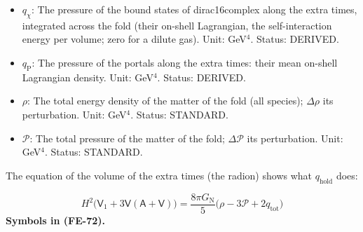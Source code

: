 \documentclass[
  10pt,
]{article}
\begin{document}
\begin{itemize}
\item
  \(q_\chi\): The pressure of the bound states of dirac16complex along
  the extra times, integrated across the fold (their on-shell
  Lagrangian, the self-interaction energy per volume; zero for a dilute
  gas). Unit: GeV\(^4\). Status: DERIVED.
\item
  \(q_{\mathrm{P}}\): The pressure of the portals along the extra times:
  their mean on-shell Lagrangian density. Unit: GeV\(^4\). Status:
  DERIVED.
\item
  \(\rho\): The total energy density of the matter of the fold (all
  species); \(\Delta\rho\) its perturbation. Unit: GeV\(^4\). Status:
  STANDARD.
\item
  \(\mathcal{P}\): The total pressure of the matter of the fold;
  \(\Delta\mathcal{P}\) its perturbation. Unit: GeV\(^4\). Status:
  STANDARD.
\end{itemize}

The equation of the volume of the extra times (the radion) shows what
\(q_{\mathrm{hold}}\) does:

\[
H^2\big(\mathsf{V}_1 + 3\mathsf{V}(\mathsf{A} + \mathsf{V})\big) = \frac{8\pi G_{\mathrm{N}}}{5}\big(\rho - 3\mathcal{P} + 2q_{\mathrm{tot}}\big) \tag{FE-72}
\] \textbf{Symbols in (FE-72).}
\end{document}
